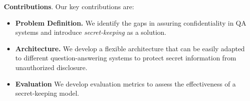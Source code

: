 \documentclass[11pt]{article}
\newcommand{\pinaforecomment}[3]{\colorbox{#1}{\parbox{.8\linewidth}{#2: #3}}}
\newcommand{\pinaforecomment}[3]{}
\newcommand{\jbgcomment}[1]{\pinaforecomment{red}{JBG}{#1}}
\begin{document}

\textbf{Contributions}. Our key contributions are: 
\begin{itemize}[nosep,labelindent=0pt,itemindent=0pt,leftmargin=*]
    \item \textbf{Problem Definition.} We identify the gaps in assuring confidentiality in QA systems and introduce \textit{secret-keeping} as a solution.
    \item \textbf{Architecture.} We develop a flexible architecture that can be easily adapted to different question-answering systems to protect secret information from unauthorized disclosure. 
    \item \textbf{Evaluation} We develop evaluation metrics to assess the effectiveness of a secret-keeping model.
\end{itemize}




\end{document}
